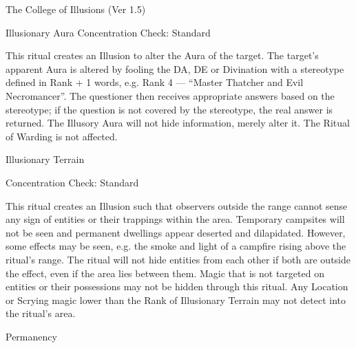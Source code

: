 \begin{Chapter}{The College of Illusions (Ver 1.5)}
\begin{ritual}[R-1]{Illusionary Aura}
Concentration Check: Standard 
\begin{effects}
This ritual creates an Illusion to alter the Aura of the target.  The
target’s apparent Aura is altered by fooling the DA, DE or Divination
with a stereotype defined in Rank + 1 words, e.g. Rank 4 — “Master
Thatcher and Evil Necromancer”.  The questioner then receives
appropriate answers based on the stereotype; if the question is not
covered by the stereotype, the real answer is returned.  The Illusory
Aura will not hide information, merely alter it. The Ritual of Warding
is not affected.
\end{effects}
\end{ritual}

\begin{ritual}[R-2]{Illusionary Terrain}

Concentration Check: Standard 
\begin{effects}
This ritual creates an Illusion such that observers outside the range
cannot sense any sign of entities or their trappings within the area.
Temporary campsites will not be seen and permanent dwellings appear
deserted and dilapidated.  However, some effects may be seen, e.g. the
smoke and light of a campfire rising above the ritual’s range.  The
ritual will not hide entities from each other if both are outside the
effect, even if the area lies between them.  Magic that is not
targeted on entities or their possessions may not be hidden through
this ritual.  Any Location or Scrying magic lower than the Rank of
Illusionary Terrain may not detect into the ritual’s area.

\end{effects}
\end{ritual}

\begin{ritual}[R-3]{Permanency}


\end{ritual}
\end{Chapter}
